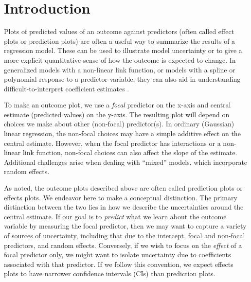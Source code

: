 
\linenumbers

\section{Introduction}

Plots of predicted values of an outcome against predictors (often called effect plots or prediction plots) are often a useful way to summarize the results of a regression model. These can be used to illustrate model uncertainty or to give a more explicit quantitative sense of how the outcome is expected to change. In generalized models with a non-linear link function, or models with a spline or polynomial response to a predictor variable, they can also aid in understanding difficult-to-interpret coefficient estimates \citep{brambor_understanding_2006, berry_improving_2012, leeper2017interpreting}. 

To make an outcome plot, we use a \emph{focal} predictor on the x-axis and central estimate (predicted values) on the y-axis. The resulting plot will depend on choices we make about other (non-focal) predictor(s). In ordinary (Gaussian) linear regression, the non-focal choices may have a simple additive effect on the central estimate. However, when the focal predictor has interactions or a non-linear link function, non-focal choices can also affect the slope of the estimate. Additional challenges arise when dealing with “mixed” models, which incorporate random effects.

As noted, the outcome plots described above are often called prediction plots or effects plots. We endeavor here to make a conceptual distinction. 
The primary distinction between the two lies in how we describe the uncertainties around the central estimate. 
If our goal is to \emph{predict} what we learn about the outcome variable by measuring the focal predictor, then we may want to capture a variety of sources of uncertainty, including that due to the intercept, focal and non-focal predictors, and random effects.
Conversely, if we wish to focus on the \emph{effect} of a focal predictor only, we might want to isolate uncertainty due to coefficients associated with that predictor.
If we follow this convention, we expect effects plots to have narrower confidence intervals (CIs) than prediction plots.

